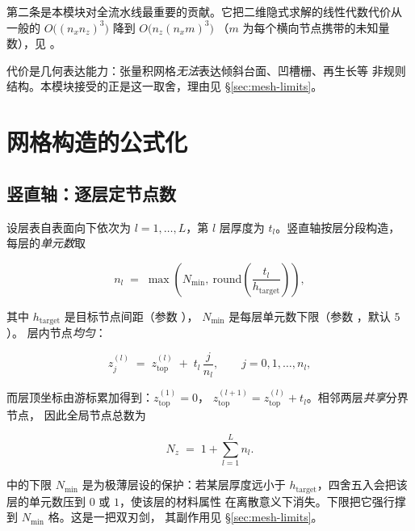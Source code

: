 第二条是本模块对全流水线最重要的贡献。它把二维隐式求解的线性代数代价从
一般的 $O\big((n_xn_z)^{3}\big)$ 降到 $O\big(n_z(n_xm)^{3}\big)$
（$m$ 为每个横向节点携带的未知量数），见 。

代价是几何表达能力：张量积网格\emph{无法}表达倾斜台面、凹槽栅、再生长等
非规则结构。本模块接受的正是这一取舍，理由见 \S\ref{sec:mesh-limits}。

\section{网格构造的公式化}
\label{sec:mesh-formulation}

\subsection{竖直轴：逐层定节点数}
\label{sec:mesh-vertical}

设层表自表面向下依次为 $l=1,\dots,L$，第 $l$ 层厚度为 $t_l$。竖直轴按层分段构造，
每层的\emph{单元数}取

\begin{equation}
n_l \;=\; \max\!\left(N_{\min},\ \mathrm{round}\!\left(\frac{t_l}{h_{\text{target}}}\right)\right),
\label{eq:mesh-ncells}
\end{equation}

其中 $h_{\text{target}}$ 是目标节点间距（参数 ），
$N_{\min}$ 是每层单元数下限（参数 ，默认 $5$）。
层内节点\emph{均匀}：

\begin{equation}
z^{(l)}_j \;=\; z^{(l)}_{\text{top}} \;+\; t_l\,\frac{j}{n_l},
\qquad j=0,1,\dots,n_l ,
\label{eq:mesh-layer-nodes}
\end{equation}

而层顶坐标由游标累加得到：$z^{(1)}_{\text{top}}=0$，
$z^{(l+1)}_{\text{top}}=z^{(l)}_{\text{top}}+t_l$。相邻两层\emph{共享}分界节点，
因此全局节点总数为

\begin{equation}
N_z \;=\; 1+\sum_{l=1}^{L} n_l .
\label{eq:mesh-node-count}
\end{equation}

 中的下限 $N_{\min}$ 是为极薄层设的保护：若某层厚度远小于
$h_{\text{target}}$，四舍五入会把该层的单元数压到 $0$ 或 $1$，使该层的材料属性
在离散意义下消失。下限把它强行撑到 $N_{\min}$ 格。这是一把双刃剑，
其副作用见 \S\ref{sec:mesh-limits}。

